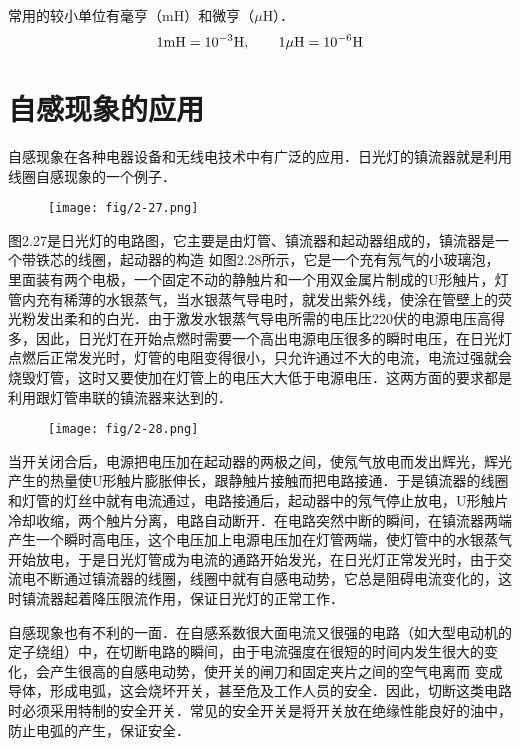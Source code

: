 常用的较小单位有毫亨（mH）和微亨（$\mu$H）．
\[1{\rm mH}=10^{-3}{\rm H},\qquad 1\mu{\rm H}=10^{-6}{\rm H}  \]

\section{自感现象的应用}
自感现象在各种电器设备和无线电技术中有广泛的应用．日光灯的镇流器就是利用线圈自感现象的一个例子．
\begin{figure}[htp]\centering
\texttt{[image: fig/2-27.png]}
\caption{}
\end{figure}

图2.27是日光灯的电路图，它主要是由灯管、镇流器和起动器组成的，镇流器是一个带铁芯的线圈，起动器的构造
如图2.28所示，它是一个充有氖气的小玻璃泡，里面装有两个电极，一个固定不动的静触片和一个用双金属片制成的U形触片，灯管内充有稀薄的水银蒸气，当水银蒸气导电时，就发出紫外线，使涂在管壁上的荧光粉发出柔和的白光．由于激发水银蒸气导电所需的电压比220伏的电源电压高得多，因此，日光灯在开始点燃时需要一个高出电源电压很多的瞬时电压，在日光灯点燃后正常发光时，灯管的电阻变得很小，只允许通过不大的电流，电流过强就会烧毁灯管，这时又要使加在灯管上的电压大大低于电源电压．这两方面的要求都是利用跟灯管串联的镇流器来达到的．
\begin{figure}[htp]\centering
\texttt{[image: fig/2-28.png]}
\caption{}
\end{figure}

当开关闭合后，电源把电压加在起动器的两极之间，使氖气放电而发出辉光，辉光产生的热量使U形触片膨胀伸长，跟静触片接触而把电路接通．于是镇流器的线圈和灯管的灯丝中就有电流通过，电路接通后，起动器中的氖气停止放电，U形触片冷却收缩，两个触片分离，电路自动断开．在电路突然中断的瞬间，在镇流器两端产生一个瞬时高电压，这个电压加上电源电压加在灯管两端，使灯管中的水银蒸气开始放电，于是日光灯管成为电流的通路开始发光，在日光灯正常发光时，由于交流电不断通过镇流器的线圈，线圈中就有自感电动势，它总是阻碍电流变化的，这时镇流器起着降压限流作用，保证日光灯的正常工作．

自感现象也有不利的一面．在自感系数很大面电流又很强的电路（如大型电动机的定子绕组）中，在切断电路的瞬间，由于电流强度在很短的时间内发生很大的变化，会产生很高的自感电动势，使开关的闸刀和固定夹片之间的空气电离而
变成导体，形成电弧，这会烧坏开关，甚至危及工作人员的安全．因此，切断这类电路时必须采用特制的安全开关．常见的安全开关是将开关放在绝缘性能良好的油中，防止电弧的产生，保证安全．

